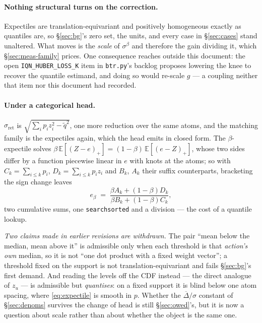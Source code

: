 \documentclass{article}
\newcommand{\E}{\mathbb{E}}
\newcommand{\gapbar}{\overline{\Delta}}
\newcommand{\sret}{\sigma_{\mathrm{ret}}}
\newcommand{\srank}{\sigma}
\newcommand{\srankb}{\sigma^{\beta}}
\begin{document}
\paragraph{Nothing structural turns on the correction.} Expectiles are translation-equivariant
and positively homogeneous exactly as quantiles are, so \S\ref{sec:bg}'s zero set, the units, and
every case in \S\ref{sec:cases} stand unaltered. What moves is the \emph{scale} of $\srankb$ and
therefore the gain dividing it, which \S\ref{sec:meas-family} prices. One consequence reaches
outside this document: the open \texttt{IQN\_HUBER\_LOSS\_K} item in \texttt{btr.py}'s backlog
proposes lowering the knee to recover the quantile estimand, and doing so would re-scale $g$ ---
a coupling neither that item nor this document had recorded.

\paragraph{Under a categorical head.} $\sret$ is $\sqrt{\sum_i p_i z_i^2 - \tilde{q}^2}$, one
more reduction over the same atoms, and the matching family is the expectiles again, which the
head emits in closed form. The $\beta$-expectile solves
$\beta\,\E[(Z-e)_+] = (1-\beta)\,\E[(e-Z)_+]$, whose two sides differ by a function piecewise
linear in $e$ with knots at the atoms; so with $C_k = \sum_{i\le k} p_i$,
$D_k = \sum_{i\le k} p_i z_i$ and $B_k$, $A_k$ their suffix counterparts, bracketing the sign
change leaves
\begin{equation}
  e_\beta \;=\; \frac{\beta A_k + (1-\beta) D_k}{\beta B_k + (1-\beta) C_k},
  \label{eq:expectile}
\end{equation}
two cumulative sums, one \texttt{searchsorted} and a division --- the cost of a quantile lookup.

\emph{Two claims made in earlier revisions are withdrawn.} The pair ``mean below the median, mean
above it'' is admissible only when each threshold is that \emph{action's own} median, so it is
not ``one dot product with a fixed weight vector''; a threshold fixed on the support is not
translation-equivariant and fails \S\ref{sec:bg}'s first demand. And reading the levels off the
CDF instead --- the direct analogue of $z_u$ --- is admissible but \emph{quantises}: on a fixed
support it is blind below one atom spacing, where \eqref{eq:expectile} is smooth in $p$.
Whether the $\gapbar/\srank$ constant of \S\ref{sec:denoms} survives the change of head is still
\S\ref{sec:owed}'s, but it is now a question about scale rather than about whether the object is
the same one.
\end{document}
